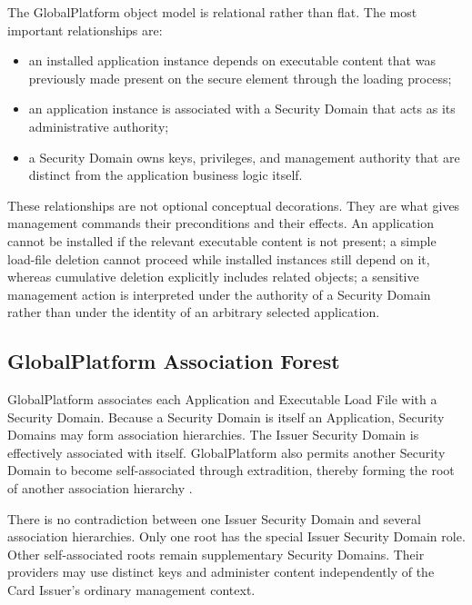 
The GlobalPlatform object model is relational rather than flat. The most
important relationships are:

\begin{itemize}
\item an installed application instance depends on executable content
  that was previously made present on the secure element through the loading
  process;
\item an application instance is associated with a Security Domain that
  acts as its administrative authority;
\item a Security Domain owns keys, privileges, and management authority
  that are distinct from the application business logic itself.
\end{itemize}

These relationships are not optional conceptual decorations. They are
what gives management commands their preconditions and their effects. An
application cannot be installed if the relevant executable content is not
present; a simple load-file deletion cannot proceed while installed instances
still depend on it, whereas cumulative deletion explicitly includes related
objects; a sensitive management action is interpreted under the authority
of a Security Domain rather than under the identity of an arbitrary
selected application.

\subsection{GlobalPlatform Association Forest}

GlobalPlatform associates each Application and Executable Load File with a
Security Domain. Because a Security Domain is itself an Application, Security
Domains may form association hierarchies. The Issuer Security Domain is
effectively associated with itself. GlobalPlatform also permits another
Security Domain to become self-associated through extradition, thereby forming
the root of another association hierarchy .

There is no contradiction between one Issuer Security Domain and several
association hierarchies. Only one root has the special Issuer Security Domain
role. Other self-associated roots remain supplementary Security Domains. Their
providers may use distinct keys and administer content independently of the
Card Issuer's ordinary management context.

